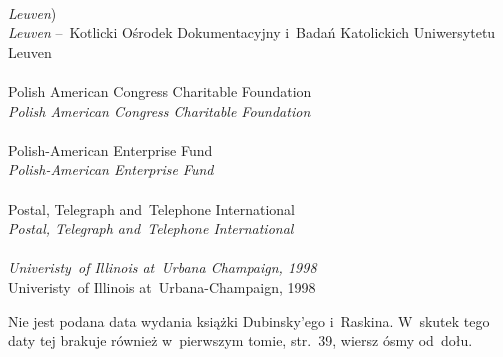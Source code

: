 \documentclass[a4paper,11pt]{article}
\begin{document}
 \\
\Jest \emph{Leuven}) \\
\Pow \emph{Leuven} --~Kotlicki Ośrodek Dokumentacyjny i~Badań
Katolickich Uniwersytetu Leuven \\
 \\
\Jest Polish American Congress Charitable Foundation \\
\Pow  \emph{Polish American Congress Charitable Foundation} \\
 \\
\Jest Polish-American Enterprise Fund \\
\Pow  \emph{Polish-American Enterprise Fund} \\
 \\
\Jest Postal, Telegraph and~Telephone International \\
\Pow  \emph{Postal, Telegraph and~Telephone International} \\
 \\
\Jest \emph{Univeristy~of Illinois at~Urbana Champaign, 1998} \\
\Pow  Univeristy~of Illinois at~Urbana-Champaign, 1998 \\

\vspace{\spaceTwo}








\start {} Nie jest podana data wydania książki
Dubinsky'ego i~Raskina. W~skutek tego daty tej brakuje również
w~pierwszym tomie, str.~39, wiersz ósmy od~dołu.
\end{document}

